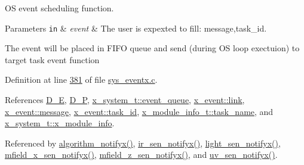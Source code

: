 O\+S event scheduling function. 


\begin{DoxyParams}[1]{Parameters}
\mbox{\tt in}  & {\em event} & The user is expexted to fill\+: message,task\+\_\+id.\\
\hline
\end{DoxyParams}
The event will be placed in F\+I\+F\+O queue and send (during O\+S loop exectuion) to target task event function 

Definition at line \hyperlink{a00037_source_l00381}{381} of file \hyperlink{a00037_source}{sys\+\_\+eventx.\+c}.



References \hyperlink{a00040_source_l00066}{D\+\_\+\+E}, \hyperlink{a00040_source_l00080}{D\+\_\+\+P}, \hyperlink{a00037_source_l00079}{x\+\_\+system\+\_\+t\+::event\+\_\+queue}, \hyperlink{a00036_source_l00062}{x\+\_\+event\+::link}, \hyperlink{a00036_source_l00064}{x\+\_\+event\+::message}, \hyperlink{a00036_source_l00065}{x\+\_\+event\+::task\+\_\+id}, \hyperlink{a00037_source_l00065}{x\+\_\+module\+\_\+info\+\_\+t\+::task\+\_\+name}, and \hyperlink{a00037_source_l00074}{x\+\_\+system\+\_\+t\+::x\+\_\+module\+\_\+info}.



Referenced by \hyperlink{a00038_source_l02006}{algorithm\+\_\+notifyx()}, \hyperlink{a00045_source_l00141}{ir\+\_\+sen\+\_\+notifyx()}, \hyperlink{a00047_source_l00106}{light\+\_\+sen\+\_\+notifyx()}, \hyperlink{a00050_source_l00107}{mfield\+\_\+x\+\_\+sen\+\_\+notifyx()}, \hyperlink{a00053_source_l00114}{mfield\+\_\+z\+\_\+sen\+\_\+notifyx()}, and \hyperlink{a00073_source_l00141}{uv\+\_\+sen\+\_\+notifyx()}.


